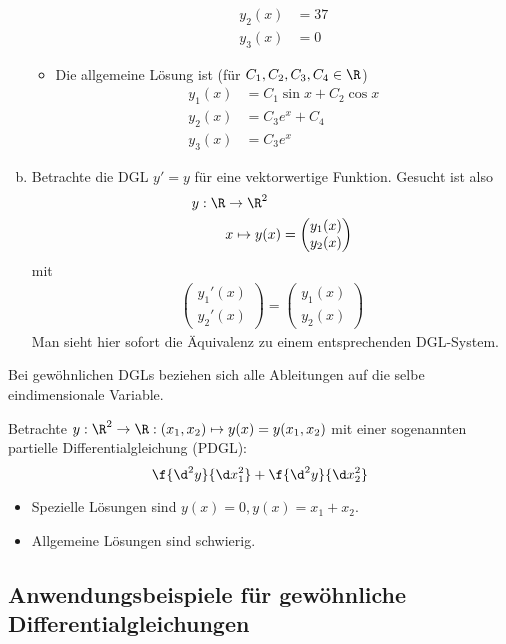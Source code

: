 \documentclass[
]{mycourse}
\begin{document}
\begin{ex}
\begin{enumerate}[a)]
\begin{itemize}
\begin{align*}
						y_2(x) &= 37 \\
						y_3(x) &= 0
					\end{align*}
				\item
					Die allgemeine Lösung ist (für $C_1,C_2,C_3,C_4 \in \R$)
					\begin{align*}
						y_1(x) &= C_1 \sin x + C_2 \cos x \\
						y_2(x) &= C_3 e^x + C_4 \\
						y_3(x) &= C_3 e^x
					\end{align*}
			\end{itemize}
		\item
			Betrachte die DGL $y' = y$ für eine vektorwertige Funktion.
			Gesucht ist also
			\begin{align*}
				y: \R &\to \R^2 \\
				& x \mapsto y(x) = \begin{pmatrix}
					y_1(x) \\ y_2(x)
				\end{pmatrix}
			\end{align*}
			mit
			\begin{align*}
				\begin{pmatrix}
					y_1'(x) \\ y_2'(x)
				\end{pmatrix}
				=
				\begin{pmatrix}
					y_1(x) \\ y_2(x)
				\end{pmatrix}
			\end{align*}
			Man sieht hier sofort die Äquivalenz zu einem entsprechenden DGL-System.
	\end{enumerate}
\end{ex}

Bei gewöhnlichen DGLs beziehen sich alle Ableitungen auf die selbe eindimensionale Variable.

\begin{ex} \label{1.2}
	Betrachte $y : \R^2 \to \R : (x_1,x_2) \mapsto y(x) = y(x_1,x_2)$ mit einer sogenannten partielle Differentialgleichung (PDGL):
	\[
		\f{\d^2y}{\d x_1^2} + \f{\d^2 y}{\d x_2^2 }
	\]
	\begin{itemize}
		\item
			Spezielle Lösungen sind $y(x) = 0, y(x) = x_1 + x_2$.
		\item
			Allgemeine Lösungen sind schwierig.
	\end{itemize}
\end{ex}

\subsection{Anwendungsbeispiele für gewöhnliche Differentialgleichungen}
\end{document}
